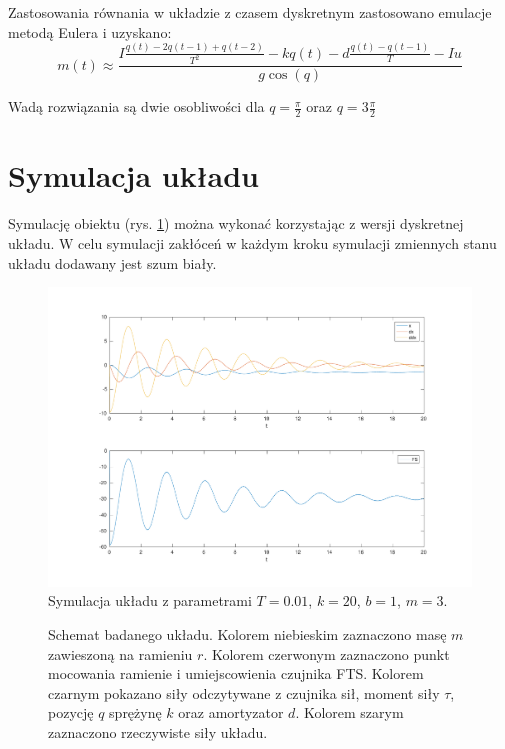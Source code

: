 \documentclass[a4paper, 10pt]{article}
\begin{document}
Zastosowania równania w układzie z czasem dyskretnym zastosowano emulacje metodą Eulera i uzyskano:
\begin{equation}
m(t) \approx \frac{I\frac{q(t)-2q(t-1)+q(t-2)}{T^2}-kq(t)-d\frac{q(t)-q(t-1)}{T}-Iu}{g\cos(q)}
\end{equation}

Wadą rozwiązania są dwie osobliwości dla $q = \frac{\pi}{2}$ oraz $q = 3\frac{\pi}{2}$

\section{Symulacja układu}

Symulację obiektu (rys. \ref{fig:system}) można wykonać korzystając z wersji dyskretnej układu. W celu symulacji zakłóceń w każdym kroku symulacji zmiennych stanu układu dodawany jest szum biały.

\begin{figure}[H]
	\includegraphics[width=0.99\linewidth]{system_sys}
	\centering
	\caption{Symulacja układu z parametrami $T=0.01$, $k = 20$, $b = 1$, $m = 3$.}
	\label{fig:system}
\end{figure}


\begin{figure}[H]
	\centering
	\caption{Schemat badanego układu. Kolorem niebieskim zaznaczono masę $m$ zawieszoną na ramieniu $r$. Kolorem czerwonym zaznaczono punkt mocowania ramienie i umiejscowienia czujnika FTS. Kolorem czarnym pokazano siły odczytywane z czujnika sił, moment siły $\tau$, pozycję $q$ sprężynę $k$ oraz amortyzator $d$. Kolorem szarym zaznaczono rzeczywiste siły układu.}
	\label{fig:2d}
\end{figure}
\end{document}
